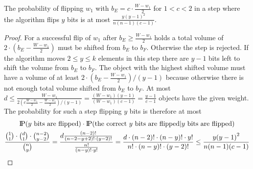 \begin{lemma}\label{lemma:W1FlipWontHappen}
    The probability of flipping $w_1$ with $b_E = c\cdot\frac{W-w_1}{2}$ for $1<c<2$ in a step where the algorithm flips $y$ bits is at most \(\frac{y{(y-1)}^2}{n(n-1)(c-1)}\).
\end{lemma}
\begin{proof}
    For a successful flip of $w_1$ after $b_E \ge \frac{W-w_1}{2}$ holds a total volume of $2\cdot(b_E-\frac{W-w_1}{2})$ must be shifted from $b_E$ to $b_F$.
    Otherwise the step is rejected.
    If the algorithm moves $2\le y\le k$ elements in this step there are $y-1$ bits left to shift the volume from $b_E$ to $b_F$.
    The object with the highest shifted volume must have a volume of at least $2\cdot(b_E-\frac{W-w_1}{2})/(y-1)$ because otherwise there is not enough total volume shifted from $b_E$ to $b_F$.
    At most \(d\le\frac{W-w_1}{2(c\frac{W-w_1}{2}-\frac{W-w_1}{2})/(y-1)}=\frac{(W-w_1)(y-1)}{(W-w_1)(c-1)}=\frac{y-1}{c-1}\) objects have the given weight.
    The probability for such a step flipping $y$ bits is therefore at most
    \begin{gather}
        \nonumber \text{I\kern-0.15em P}(y \text{ bits are flipped})\cdot\text{I\kern-0.15em P}(\text{the correct $y$ bits are flipped} | y \text{ bits are flipped})\\ \nonumber
        \frac{\binom{1}{1}\cdot\binom{d}{1}\cdot\binom{n-2}{y-2}}{\binom{n}{y}}
        =\frac{d\frac{(n-2)!}{(n-2-y+2)!\cdot (y-2)!}}{\frac{n!}{(n-y)!\cdot y!}}
        =\frac{d\cdot(n-2)!\cdot(n-y)!\cdot y!}{n!\cdot(n-y)!\cdot(y-2)!}
        \le \frac{y{(y-1)}^2}{n(n-1)(c-1)}
    \end{gather}
\end{proof}

